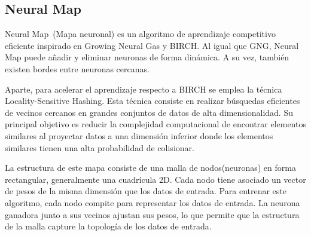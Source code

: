 \subsection{Neural Map}

Neural Map~(Mapa neuronal) es un algoritmo de aprendizaje competitivo eficiente inspirado en Growing Neural Gas y BIRCH. Al igual que GNG, Neural Map puede añadir y eliminar neuronas de forma dinámica. A su vez, también existen bordes entre neuronas cercanas.


Aparte, para acelerar el aprendizaje respecto a BIRCH se emplea la técnica Locality-Sensitive Hashing. Esta técnica consiste en realizar búsquedas eficientes de vecinos cercanos en grandes conjuntos de datos de alta dimensionalidad. Su principal objetivo es reducir la complejidad computacional de encontrar elementos similares al proyectar datos a una dimensión inferior donde los elementos similares tienen una alta probabilidad de colisionar.

La estructura de este mapa consiste de una malla de nodos(neuronas) en forma rectangular, generalmente una cuadrícula 2D. Cada nodo tiene asociado un vector de pesos de la misma dimensión que los datos de entrada. Para entrenar este algoritmo, cada nodo compite para representar los datos de entrada. La neurona ganadora junto a sus vecinos ajustan sus pesos, lo que permite que la estructura de la malla capture la topología de los datos de entrada. 
